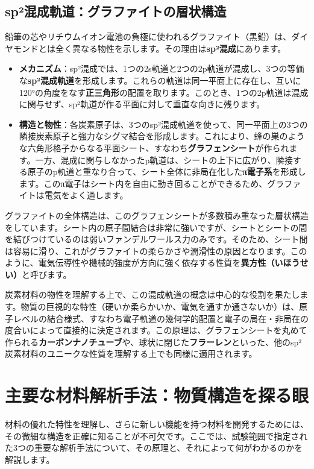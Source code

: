 \documentclass[11pt,a4paper]{ltjsarticle}
\begin{document}
\subsection{sp²混成軌道：グラファイトの層状構造}
鉛筆の芯やリチウムイオン電池の負極に使われるグラファイト（黒鉛）は、ダイヤモンドとは全く異なる物性を示します。その理由は\textbf{sp²混成}にあります\cite{ref1}。
\begin{itemize}
    \item \textbf{メカニズム}：sp²混成では、1つの2s軌道と2つの2p軌道が混成し、3つの等価な\textbf{sp²混成軌道}を形成します。これらの軌道は同一平面上に存在し、互いに\ang{120}の角度をなす\textbf{正三角形}の配置を取ります。このとき、1つの2p軌道は混成に関与せず、sp²軌道が作る平面に対して垂直な向きに残ります\cite{ref1}。
    \item \textbf{構造と物性}：各炭素原子は、3つのsp²混成軌道を使って、同一平面上の3つの隣接炭素原子と強力なシグマ結合を形成します。これにより、蜂の巣のような六角形格子からなる平面シート、すなわち\textbf{グラフェンシート}が作られます\cite{ref1}。一方、混成に関与しなかったp軌道は、シートの上下に広がり、隣接する原子のp軌道と重なり合って、シート全体に非局在化した\textbf{π電子系}を形成します。このπ電子はシート内を自由に動き回ることができるため、グラファイトは電気をよく通します。
\end{itemize}
グラファイトの全体構造は、このグラフェンシートが多数積み重なった層状構造をしています。シート内の原子間結合は非常に強いですが、シートとシートの間を結びつけているのは弱いファンデルワールス力のみです。そのため、シート間は容易に滑り、これがグラファイトの柔らかさや潤滑性の原因となります。このように、電気伝導性や機械的強度が方向に強く依存する性質を\textbf{異方性（いほうせい）}と呼びます\cite{ref1}。

炭素材料の物性を理解する上で、この混成軌道の概念は中心的な役割を果たします。物質の巨視的な特性（硬いか柔らかいか、電気を通すか通さないか）は、原子レベルの結合様式、すなわち電子軌道の幾何学的配置と電子の局在・非局在の度合いによって直接的に決定されます。この原理は、グラフェンシートを丸めて作られる\textbf{カーボンナノチューブ}や、球状に閉じた\textbf{フラーレン}といった、他のsp²炭素材料のユニークな性質を理解する上でも同様に適用されます。

\section{主要な材料解析手法：物質構造を探る眼}
材料の優れた特性を理解し、さらに新しい機能を持つ材料を開発するためには、その微細な構造を正確に知ることが不可欠です。ここでは、試験範囲で指定された3つの重要な解析手法について、その原理と、それによって何がわかるのかを解説します。
\end{document}
